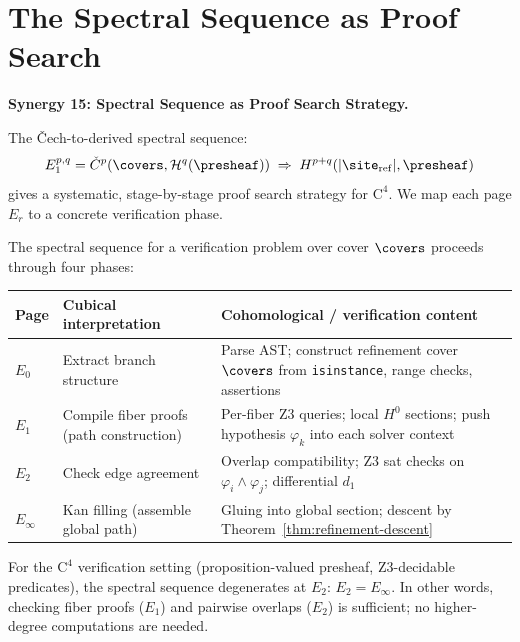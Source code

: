 \section{The Spectral Sequence as Proof Search}
\label{sec:spectral-sequence}

\noindent\textbf{Synergy 15: Spectral Sequence as Proof Search Strategy.}

The \v{C}ech-to-derived spectral sequence:
\[
  E_1^{p,q} = \check{C}^p(\covers, \mathcal{H}^q(\presheaf))
  \;\Rightarrow\; H^{p+q}(|\site_{\mathrm{ref}}|, \presheaf)
\]
gives a systematic, stage-by-stage proof search strategy for
$\mathrm{C}^4$.  We map each page $E_r$ to a concrete verification phase.

\begin{definition}
\label{def:spectral-proof-search}
The spectral sequence for a verification problem over cover $\covers$
proceeds through four phases:
\begin{center}
\renewcommand{\arraystretch}{1.4}
\begin{tabular}{llp{6cm}}
\toprule
\textbf{Page} & \textbf{Cubical interpretation} &
  \textbf{Cohomological / verification content} \\
\midrule
$E_0$ & Extract branch structure &
  Parse AST; construct refinement cover $\covers$ from
  \texttt{isinstance}, range checks, assertions \\
$E_1$ & Compile fiber proofs (path construction) &
  Per-fiber Z3 queries; local $H^0$ sections;
  push hypothesis $\varphi_k$ into each solver context \\
$E_2$ & Check edge agreement &
  Overlap compatibility; Z3 sat checks on
  $\varphi_i \wedge \varphi_j$; differential $d_1$ \\
$E_\infty$ & Kan filling (assemble global path) &
  Gluing into global section; descent by
  Theorem~\ref{thm:refinement-descent} \\
\bottomrule
\end{tabular}
\end{center}
\end{definition}

\begin{theorem}
\label{thm:spectral-degeneration}
For the $\mathrm{C}^4$ verification setting (proposition-valued presheaf,
Z3-decidable predicates), the spectral sequence degenerates at $E_2$:
$E_2 = E_\infty$.  In other words, checking fiber proofs ($E_1$) and
pairwise overlaps ($E_2$) is sufficient; no higher-degree computations
are needed.
\end{theorem}

